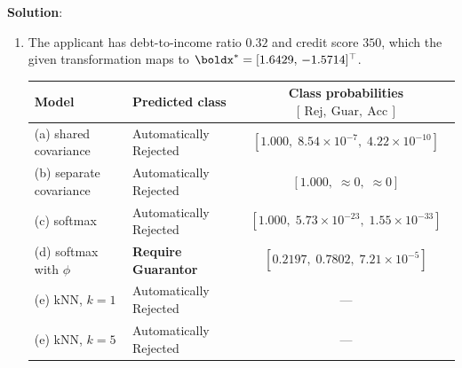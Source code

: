 \documentclass[submit]{../harvardml}
\newenvironment{solution}{
    \vspace{2mm}
    \color{blue}\noindent\textbf{Solution}:
}{}
\begin{document}
\begin{solution}
\begin{enumerate}
\begin{itemize}
  \item \textbf{(e) kNN $\Rightarrow$ piecewise-linear, non-parametric boundaries.} The
    boundary is a union of edges of the (distance-weighted) Voronoi diagram of the
    training points, so it is irregular and purely local. With $k=1$ it hugs the data
    exactly ($100\%$ training accuracy by construction) and is correspondingly jagged;
    with $k=5$ voting smooths it out, the green region shrinks, and training accuracy
    falls to $92.6\%$ --- the same bias--variance movement as Problem 1, with $k$ as
    the smoothing knob. The $1/9$ weight on the debt coordinate stretches distances
    along the credit-score axis, which is why the cells are elongated horizontally.
\end{itemize}

\noindent In short: \textbf{(a) and (c) are linear because their log-odds are linear in
$\boldx$; (b) and (d) curve because a quadratic enters (through unequal covariances and
through $x_2^2$ respectively); (e) is irregular because it fits no global function at
all.}

\item
The applicant has debt-to-income ratio $0.32$ and credit score $350$, which the given
transformation maps to $\boldx^* = [1.6429,\, -1.5714]^\top$.

\begin{center}
\begin{tabular}{llc}
  \hline
  Model & Predicted class & Class probabilities $[\,\text{Rej},\ \text{Guar},\ \text{Acc}\,]$ \\
  \hline
  (a) shared covariance   & Automatically Rejected & $[1.000,\; 8.54\times10^{-7},\; 4.22\times10^{-10}]$ \\
  (b) separate covariance & Automatically Rejected & $[1.000,\; \approx 0,\; \approx 0]$ \\
  (c) softmax             & Automatically Rejected & $[1.000,\; 5.73\times10^{-23},\; 1.55\times10^{-33}]$ \\
  (d) softmax with $\phi$ & \textbf{Require Guarantor} & $[0.2197,\; \mathbf{0.7802},\; 7.21\times10^{-5}]$ \\
  (e) kNN, $k=1$          & Automatically Rejected & --- \\
  (e) kNN, $k=5$          & Automatically Rejected & --- \\
  \hline
\end{tabular}
\end{center}


\end{enumerate}
\end{solution}
\end{document}

